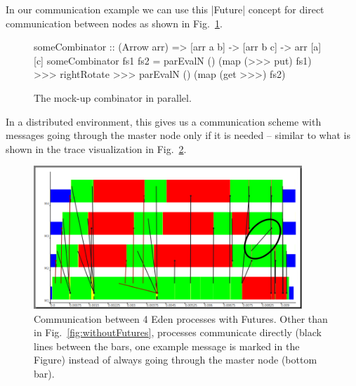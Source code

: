 In our communication example we can use this |Future| concept for direct communication between nodes as shown in Fig.~\ref{fig:someCombinatorParallel}.
\begin{figure}[tbh]
\begin{code}
someCombinator :: (Arrow arr) => [arr a b] -> [arr b c] -> arr [a] [c]
someCombinator fs1 fs2 =
	parEvalN () (map (>>> put) fs1) >>>
	rightRotate >>>
	parEvalN () (map (get >>>) fs2)
\end{code}
\caption{The mock-up combinator in parallel.}
\label{fig:someCombinatorParallel}
\end{figure}
In a distributed environment, this gives us a communication scheme with messages going through the master node only if it is needed -- similar to what is shown in the trace visualization in Fig.~\ref{fig:withFutures}. 
\begin{figure}[ht]
	\centering
	\includegraphics[width=0.9\textwidth]{images/withFutures}
	\caption[with Futures]{Communication between 4 Eden processes with Futures. Other than in Fig.~\ref{fig:withoutFutures}, processes communicate directly (black lines between the bars, one example message is marked in the Figure) instead of always going through the master node (bottom bar).}
	\label{fig:withFutures}
\end{figure}
